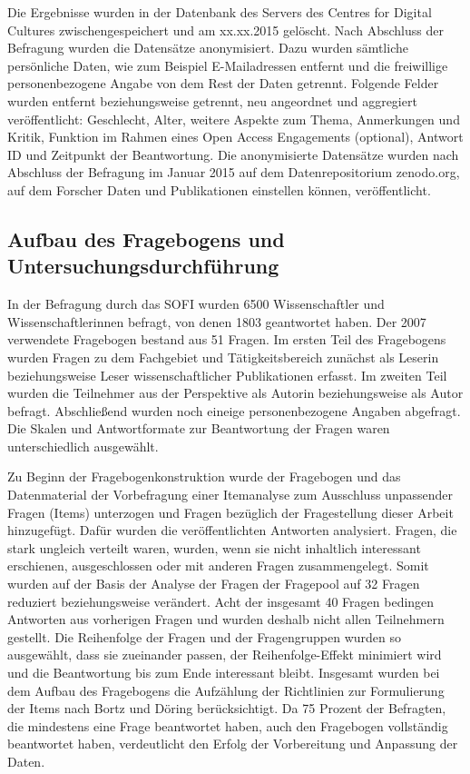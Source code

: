 Die Ergebnisse wurden in der Datenbank des Servers des Centres for Digital Cultures zwischengespeichert und am xx.xx.2015 gelöscht. Nach Abschluss der Befragung wurden die Datensätze anonymisiert. Dazu wurden sämtliche persönliche Daten, wie zum Beispiel E-Mailadressen entfernt und die freiwillige personenbezogene Angabe von dem Rest der Daten getrennt. Folgende Felder wurden entfernt beziehungsweise getrennt, neu angeordnet und aggregiert veröffentlicht: Geschlecht, Alter, weitere Aspekte zum Thema, Anmerkungen und Kritik, Funktion im Rahmen eines Open Access Engagements (optional), Antwort ID und Zeitpunkt der Beantwortung. Die anonymisierte Datensätze wurden nach Abschluss der Befragung im Januar 2015 auf dem Datenrepositorium zenodo.org, auf dem Forscher Daten und Publikationen einstellen können, veröffentlicht.

\subsection{Aufbau des Fragebogens und Untersuchungsdurchführung}

In der Befragung durch das SOFI wurden 6500 Wissenschaftler und Wissenschaftlerinnen befragt, von denen 1803 geantwortet haben. Der 2007 verwendete Fragebogen bestand aus 51 Fragen. Im ersten Teil des Fragebogens wurden Fragen zu dem Fachgebiet und Tätigkeitsbereich zunächst als Leserin beziehungsweise Leser wissenschaftlicher Publikationen erfasst. Im zweiten Teil wurden die Teilnehmer aus der Perspektive als Autorin beziehungsweise als Autor befragt. Abschließend wurden noch eineige personenbezogene Angaben abgefragt. \cite{Hanekop_Wittke_2007_Fragebogen} Die Skalen und Antwortformate zur Beantwortung der Fragen waren unterschiedlich ausgewählt.

Zu Beginn der Fragebogenkonstruktion wurde der Fragebogen und das Datenmaterial der Vorbefragung einer Itemanalyse zum Ausschluss unpassender Fragen (Items) unterzogen und Fragen bezüglich der Fragestellung dieser Arbeit hinzugefügt. Dafür wurden die veröffentlichten Antworten analysiert. Fragen, die stark ungleich verteilt waren, wurden, wenn sie nicht inhaltlich interessant erschienen, ausgeschlossen oder mit anderen Fragen zusammengelegt. Somit wurden auf der Basis der Analyse der Fragen der Fragepool auf 32 Fragen reduziert beziehungsweise verändert. Acht der insgesamt 40 Fragen bedingen Antworten aus vorherigen Fragen und wurden deshalb nicht allen Teilnehmern gestellt. Die Reihenfolge der Fragen und der Fragengruppen wurden so ausgewählt, dass sie zueinander passen, der Reihenfolge-Effekt minimiert wird und die Beantwortung bis zum Ende interessant bleibt. Insgesamt wurden bei dem Aufbau des Fragebogens die Aufzählung der Richtlinien zur Formulierung der Items nach Bortz und Döring \cite{raab_2012_fragebogen} berücksichtigt. Da 75 Prozent der Befragten, die mindestens eine Frage beantwortet haben, auch den Fragebogen vollständig beantwortet haben, verdeutlicht den Erfolg der Vorbereitung und Anpassung der Daten.

